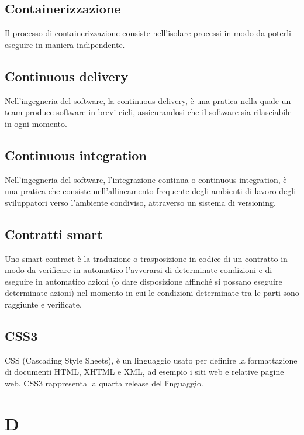 \subsection{Containerizzazione}  Il processo di containerizzazione consiste nell'isolare processi in modo da poterli eseguire in maniera indipendente.
\subsection{Continuous delivery}  Nell'ingegneria del software, la continuous delivery, è una pratica nella quale un team produce software in brevi cicli, assicurandosi che il software sia rilasciabile in ogni momento.
\subsection{Continuous integration}  Nell'ingegneria del software, l'integrazione continua o continuous integration, è una pratica che consiste nell'allineamento frequente degli ambienti di lavoro degli sviluppatori verso l'ambiente condiviso, attraverso un sistema di versioning.
\subsection{Contratti smart}  Uno smart contract è la traduzione o trasposizione in codice di un contratto in modo da verificare in automatico l’avverarsi di determinate condizioni e di eseguire in automatico azioni (o dare disposizione affinché si possano eseguire determinate azioni) nel momento in cui le condizioni determinate tra le parti sono raggiunte e verificate.
\subsection{CSS3}  CSS (Cascading Style Sheets), è un linguaggio usato per definire la formattazione di documenti HTML, XHTML e XML, ad esempio i siti web e relative pagine web. CSS3 rappresenta la quarta release del linguaggio.


\newpage \section{D}
